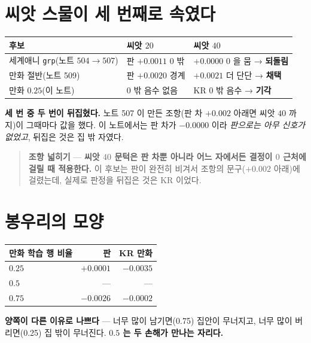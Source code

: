 \documentclass[11pt]{article}
\begin{document}
\section{씨앗 스물이 세 번째로 속였다}

\begin{center}
\begin{tabular}{lll}
\hline
후보 & 씨앗 $20$ & 씨앗 $40$ \\
\hline
세계애니 \texttt{grp}(노트 $504 \to 507$) & 판 $+0.0011$ $0$ 밖 & $+0.0000$ $0$ 을 뭄 → \textbf{되돌림} \\
만화 절반(노트 509) & 판 $+0.0020$ 경계 & $+0.0021$ 더 단단 → \textbf{채택} \\
만화 $0.25$(이 노트) & $0$ 밖 음수 없음 & KR $0$ 밖 음수 → \textbf{기각} \\
\hline
\end{tabular}
\end{center}

\textbf{세 번 중 두 번이 뒤집혔다.} 노트 507 이 만든 조항(판 차 $+0.002$
아래면 씨앗 $40$ 까지)이 그때마다 값을 했다. 이 노트에서는 판 차가
$-0.0000$ 이라 \emph{판으로는 아무 신호가 없었고}, 뒤집은 것은 집 밖
자였다.

\begin{quote}
\textbf{조항 넓히기} --- \textbf{씨앗 $40$ 문턱은 판 차뿐 아니라 어느
자에서든 결정이 $0$ 근처에 걸릴 때 적용한다.} 이 후보는 판이 완전히
비겨서 조항의 문구($+0.002$ 아래)에 걸렸는데, 실제로 판정을 뒤집은 것은
KR 이었다.
\end{quote}

\section{봉우리의 모양}

\begin{center}
\begin{tabular}{lrr}
\hline
만화 학습 행 비율 & 판 & KR 만화 \\
\hline
$0.25$ & $+0.0001$ & $\mathbf{-0.0035}$ \\
$\mathbf{0.5}$ & --- & --- \\
$0.75$ & $\mathbf{-0.0026}$ & $-0.0002$ \\
\hline
\end{tabular}
\end{center}

\textbf{양쪽이 다른 이유로 나쁘다} --- 너무 많이 남기면(0.75) 집안이
무너지고, 너무 많이 버리면(0.25) 집 밖이 무너진다. \textbf{$0.5$ 는 두
손해가 만나는 자리다.}
\end{document}
